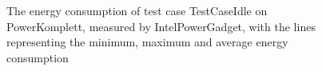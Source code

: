 \begin{figure}
                    \caption{The energy consumption of test case TestCaseIdle on PowerKomplett, measured by IntelPowerGadget, with the lines representing the minimum, maximum and average energy consumption} \label{fig:time_series_TestCaseIdle_PowerKomplett_IntelPowerGadget_exp2}
                    \end{figure}
                    